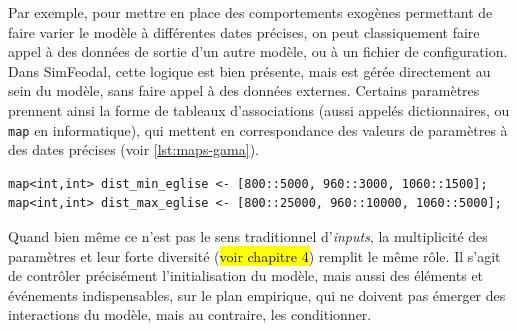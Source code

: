 Par exemple, pour mettre en place des comportements exogènes permettant de faire varier le modèle à différentes dates précises, on peut classiquement faire appel à des données de sortie d'un autre modèle, ou à un fichier de configuration.
Dans SimFeodal, cette logique est bien présente, mais est gérée directement au sein du modèle, sans faire appel à des données externes.
Certains paramètres prennent ainsi la forme de tableaux d'associations (aussi appelés dictionnaires, ou \og \texttt{map}\fg{} en informatique), qui mettent en correspondance des valeurs de paramètres à des dates précises (voir \cref{lst:maps-gama}).
\medskip

{\footnotesize
	\begin{lstlisting}[caption={
	Deux exemples de \texttt{map} dans Gama.
	\textit{À partir de 800, les églises doivent se situer entre 5 et 25~km, puis entre 3 et 10~km de 960 à 1060, et entre 1.5 et 5~km après cette date.}}, captionpos=b, label={lst:maps-gama}]
map<int,int> dist_min_eglise <- [800::5000, 960::3000, 1060::1500];
map<int,int> dist_max_eglise <- [800::25000, 960::10000, 1060::5000]; 
	\end{lstlisting}
}



Quand bien même ce n'est pas le sens traditionnel d'\textit{inputs}, la multiplicité des paramètres et leur forte diversité (\hl{voir chapitre 4}) remplit le même rôle.
Il s'agit de contrôler précisément l'initialisation du modèle, mais aussi des éléments et événements indispensables, sur le plan empirique, qui ne doivent pas émerger des interactions du modèle, mais au contraire, les conditionner.


